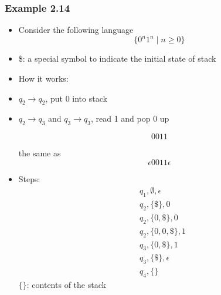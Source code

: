 \begin{frame}[allowframebreaks] \frametitle{Example 2.14}
  \begin{itemize}
  \item Consider the following language
    \begin{equation*}
    \{0^n 1^n\mid n \geq 0\}
  \end{equation*}

\begin{center}
\end{center}
\item \$: a special symbol to indicate the initial state of stack

  
\item How it works:
  \item [] $q_2 \rightarrow q_2$, put 0 into stack

  \item [] $q_2 \rightarrow q_3$ and $q_3 \rightarrow q_3$, read 1 and  pop 0 up

  \begin{equation*}
    0011
  \end{equation*}

the same as
  \begin{equation*}
    \epsilon 0011 \epsilon
  \end{equation*}
\item Steps:
  \begin{equation*}
    \begin{split}
& q_1, \emptyset, \epsilon\\
& q_2, \{\$\}, 0 \\
& q_2, \{0,\$\}, 0\\
& q_2, \{0,0,\$\}, 1\\
& q_3, \{0,\$\}, 1\\
& q_3, \{\$\}, \epsilon\\
& q_4, \{\}
\end{split}
\end{equation*}
$\{\}$: contents of the stack


\end{itemize}
\end{frame}

